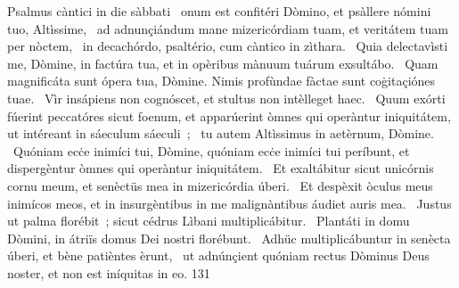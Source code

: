 { Psalmus càntici in die sàbbati}
{%
~onum est confitéri Dòmino, et psàllere nómini tuo, Altìssime, 
~ad adnunçiándum mane mizericórdiam tuam, et veritátem tuam per nòctem, 
~in decachórdo, psaltério, cum càntico in zìthara. 
~Quia delectavìsti me, Dòmine, in factúra tua, et in opèribus mànuum tuárum exsultábo. 
~Quam magnificáta sunt ópera tua, Dòmine. Nimis profùndae fàctae sunt coġitaçiónes tuae. 
~Vìr insápiens non cognóscet, et stultus non intèlleget haec. 
~Quum exórti fúerint peccatóres sicut foenum, et apparúerint òmnes qui operàntur iniquitátem, ut intéreant in sáeculum sáeculi~; 
~tu autem Altìssimus in aetèrnum, Dòmine. 
~Quóniam ecċe inimíci tui, Dòmine, quóniam ecċe inimíci tui períbunt, et dispergèntur òmnes qui operàntur iniquitátem. 
~Et exaltábitur sicut unicórnis cornu meum, et senèctüs mea in mizericórdia úberi. 
~Et despèxit òculus meus inimícos meos, et in insurgèntibus in me malignàntibus áudiet auris mea. 
~Justus ut palma florébit~; sicut cédrus Lìbani multiplicábitur. 
~Plantáti in domu Dòmini, in átriïs domus Dei nostri florébunt. 
~Adhüc multiplicábuntur in senècta úberi, et bène patièntes èrunt, 
~ut adnúnçient quóniam rectus Dòminus Deus noster, et non est iníquitas in eo. 
}
{13}{1}
